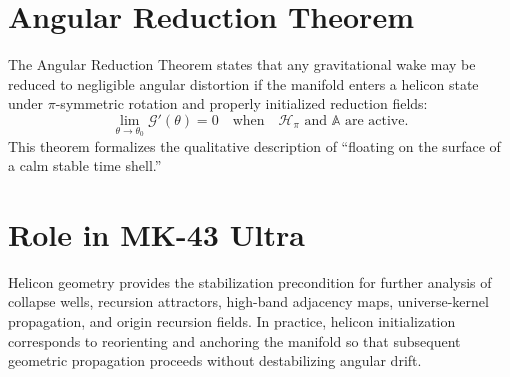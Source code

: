 \section{Angular Reduction Theorem}
The Angular Reduction Theorem states that any gravitational wake may be reduced to negligible angular distortion if the manifold enters a helicon state under $\pi$-symmetric rotation and properly initialized reduction fields:
\[
\lim_{\theta \to \theta_0} \mathscr{G}'(\theta) = 0
\quad\text{when}\quad 
\mathscr{H}_{\pi} \text{ and } \mathbb{A} \text{ are active.}
\]
This theorem formalizes the qualitative description of ``floating on the surface of a calm stable time shell.''

\section{Role in MK-43 Ultra}
Helicon geometry provides the stabilization precondition for further analysis of collapse wells, recursion attractors, high-band adjacency maps, universe-kernel propagation, and origin recursion fields. In practice, helicon initialization corresponds to reorienting and anchoring the manifold so that subsequent geometric propagation proceeds without destabilizing angular drift.
